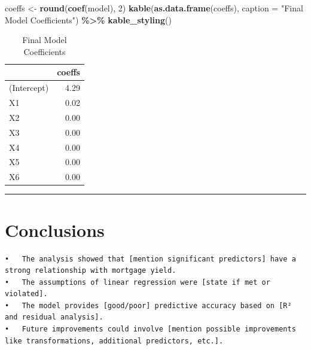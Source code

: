 \documentclass[
  12pt,
]{article}
\newenvironment{Shaded}{\begin{snugshade}}{\end{snugshade}}
\newcommand{\AttributeTok}[1]{\textcolor[rgb]{0.13,0.29,0.53}{#1}}
\newcommand{\DecValTok}[1]{\textcolor[rgb]{0.00,0.00,0.81}{#1}}
\newcommand{\FunctionTok}[1]{\textcolor[rgb]{0.13,0.29,0.53}{\textbf{#1}}}
\newcommand{\NormalTok}[1]{#1}
\newcommand{\OtherTok}[1]{\textcolor[rgb]{0.56,0.35,0.01}{#1}}
\newcommand{\SpecialCharTok}[1]{\textcolor[rgb]{0.81,0.36,0.00}{\textbf{#1}}}
\newcommand{\StringTok}[1]{\textcolor[rgb]{0.31,0.60,0.02}{#1}}
\begin{document}
\begin{Shaded}
\begin{Highlighting}[]
\NormalTok{coeffs }\OtherTok{\textless{}{-}} \FunctionTok{round}\NormalTok{(}\FunctionTok{coef}\NormalTok{(model), }\DecValTok{2}\NormalTok{)}
\FunctionTok{kable}\NormalTok{(}\FunctionTok{as.data.frame}\NormalTok{(coeffs), }\AttributeTok{caption =} \StringTok{"Final Model Coefficients"}\NormalTok{) }\SpecialCharTok{\%\textgreater{}\%} \FunctionTok{kable\_styling}\NormalTok{()}
\end{Highlighting}
\end{Shaded}

\begin{longtable}[t]{lr}
\caption{\label{tab:unnamed-chunk-20}Final Model Coefficients}\\
\toprule
 & coeffs\\
\midrule
(Intercept) & 4.29\\
X1 & 0.02\\
X2 & 0.00\\
X3 & 0.00\\
X4 & 0.00\\
\addlinespace
X5 & 0.00\\
X6 & 0.00\\
\bottomrule
\end{longtable}

\begin{center}\rule{0.5\linewidth}{0.5pt}\end{center}

\section{Conclusions}\label{conclusions}

\begin{verbatim}
•   The analysis showed that [mention significant predictors] have a strong relationship with mortgage yield.
•   The assumptions of linear regression were [state if met or violated].
•   The model provides [good/poor] predictive accuracy based on [R² and residual analysis].
•   Future improvements could involve [mention possible improvements like transformations, additional predictors, etc.].
\end{verbatim}
\end{document}
